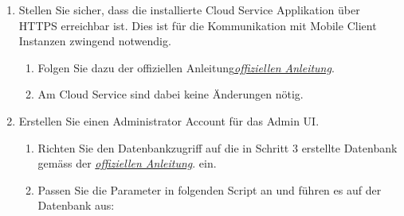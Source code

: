 \begin{enumerate}
    \item Stellen Sie sicher, dass die installierte Cloud Service Applikation über HTTPS erreichbar ist. Dies ist für die Kommunikation mit Mobile Client Instanzen zwingend notwendig.
    \begin{enumerate}
        \item Folgen Sie dazu der offiziellen Anleitung\href{https://aws.amazon.com/premiumsupport/knowledge-center/elastic-beanstalk-https-configuration/}{\textit{offiziellen Anleitung}}\cite{aws-elastic-https}.
        \item Am Cloud Service sind dabei keine Änderungen nötig. 
    \end{enumerate}
    \item Erstellen Sie einen Administrator Account für das Admin UI.
    \begin{enumerate}
        \item Richten Sie den Datenbankzugriff auf die in Schritt 3 erstellte Datenbank gemäss der \href{https://docs.aws.amazon.com/AmazonRDS/latest/UserGuide/USER_ConnectToPostgreSQLInstance.html}{\textit{offiziellen Anleitung}}\cite{aws-elastic-rds-access}. ein.
        \item Passen Sie die Parameter in folgenden Script an und führen es auf der Datenbank aus:
        

    \end{enumerate}

\end{enumerate}


\clearpage
